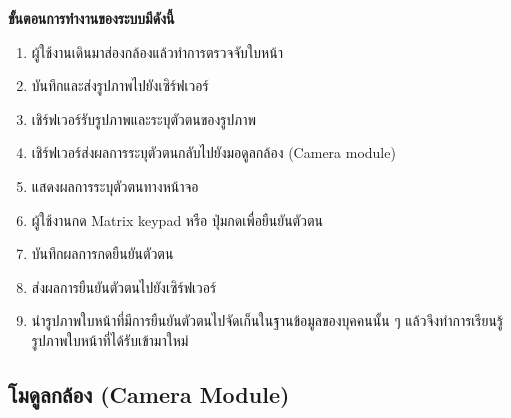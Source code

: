 \textbf{ขั้นตอนการทำงานของระบบมีดังนี้}
\begin{enumerate}
  \item ผู้ใช้งานเดินมาส่องกล้องแล้วทำการตรวจจับใบหน้า
  \item บันทึกและส่งรูปภาพไปยังเซิร์ฟเวอร์
  \item เชิร์ฟเวอร์รับรูปภาพและระบุตัวตนของรูปภาพ
  \item เชิร์ฟเวอร์ส่งผลการระบุตัวตนกลับไปยังมอดูลกล้อง (Camera module)
  \item แสดงผลการระบุตัวตนทางหน้าจอ
  \item ผู้ใช้งานกด Matrix keypad หรือ ปุ่มกดเพื่อยืนยันตัวตน
  \item บันทึกผลการกดยืนยันตัวตน
  \item ส่งผลการยืนยันตัวตนไปยังเซิร์ฟเวอร์
  \item นำรูปภาพใบหน้าที่มีการยืนยันตัวตนไปจัดเก็นในฐานข้อมูลของบุคคนนั้น ๆ แล้วจึงทำการเรียนรู้รูปภาพใบหน้าที่ได้รับเข้ามาใหม่
\end{enumerate}

\subsection{โมดูลกล้อง (Camera Module)}

